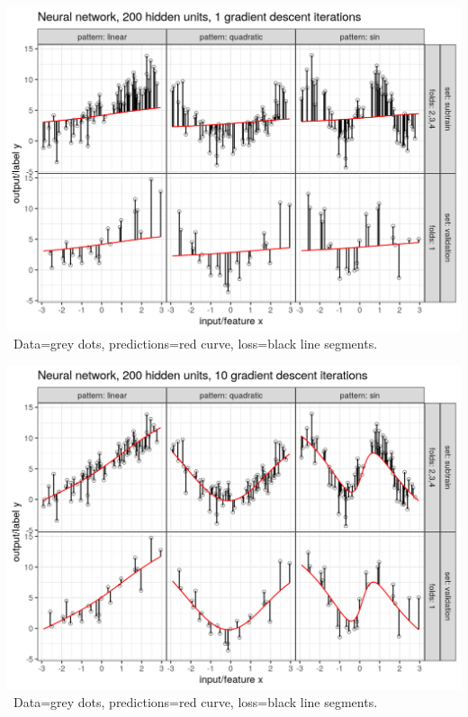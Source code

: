 
\begin{frame}
  \includegraphics[width=\textwidth]{figure-overfitting-pred-units=200-maxit=1.png}
\ Data=grey dots, predictions=red curve, loss=black line segments.

\end{frame}


\begin{frame}
  \includegraphics[width=\textwidth]{figure-overfitting-pred-units=200-maxit=10.png}
\ Data=grey dots, predictions=red curve, loss=black line segments.

\end{frame}


